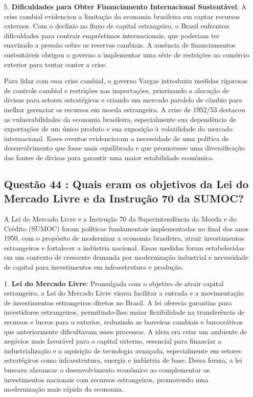 \documentclass[a4paper,12pt]{article}[abntex2]
\begin{document}
5. \textbf{Dificuldades para Obter Financiamento Internacional Sustentável}: A crise cambial evidenciou a limitação da economia brasileira em captar recursos externos. Com o declínio no fluxo de capital estrangeiro, o Brasil enfrentou dificuldades para contrair empréstimos internacionais, que poderiam ter suavizado a pressão sobre as reservas cambiais. A ausência de financiamentos sustentáveis obrigou o governo a implementar uma série de restrições no comércio exterior para tentar conter a crise.

Para lidar com essa crise cambial, o governo Vargas introduziu medidas rigorosas de controle cambial e restrições nas importações, priorizando a alocação de divisas para setores estratégicos e criando um mercado paralelo de câmbio para melhor gerenciar os recursos em moeda estrangeira. A crise de 1952/53 destacou as vulnerabilidades da economia brasileira, especialmente sua dependência de exportações de um único produto e sua exposição à volatilidade do mercado internacional. Esses eventos evidenciaram a necessidade de uma política de desenvolvimento que fosse mais equilibrada e que promovesse uma diversificação das fontes de divisas para garantir uma maior estabilidade econômica.

\subsection{\textbf{Questão 44 : Quais eram os objetivos da Lei do Mercado Livre e da Instrução 70 da SUMOC?}}

A Lei do Mercado Livre e a Instrução 70 da Superintendência da Moeda e do Crédito (SUMOC) foram políticas fundamentais implementadas no final dos anos 1950, com o propósito de modernizar a economia brasileira, atrair investimentos estrangeiros e fortalecer a indústria nacional. Essas medidas foram estabelecidas em um contexto de crescente demanda por modernização industrial e necessidade de capital para investimentos em infraestrutura e produção.

1. \textbf{Lei do Mercado Livre}: Promulgada com o objetivo de atrair capital estrangeiro, a Lei do Mercado Livre visava facilitar a entrada e a movimentação de investimentos estrangeiros diretos no Brasil. A lei oferecia garantias para investidores estrangeiros, permitindo-lhes maior flexibilidade na transferência de recursos e lucros para o exterior, reduzindo as barreiras cambiais e burocráticas que anteriormente dificultavam esses processos. A ideia era criar um ambiente de negócios mais favorável para o capital externo, essencial para financiar a industrialização e a aquisição de tecnologia avançada, especialmente em setores estratégicos como infraestrutura, energia e indústria de base. Dessa forma, a lei buscava alavancar o desenvolvimento econômico ao complementar os investimentos nacionais com recursos estrangeiros, promovendo uma modernização mais rápida da economia.
\end{document}
